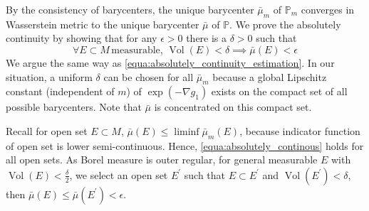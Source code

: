 By the consistency of barycenters, the unique barycenter $\bar{\mu}_m$ of $\mathbb{P}_m$
converges in Wasserstein metric to the unique barycenter $\bar{\mu}$ of $\mathbb{P}$.
We prove the absolutely continuity by showing that
for any $\epsilon > 0$ there is a $\delta > 0$ such that
\begin{equation}
	\label{equa:absolutely_continous}
	\forall E \subset M \, \text{measurable, } \operatorname{Vol}(E) < \delta
	\implies \bar{\mu}(E) < \epsilon
\end{equation}
We argue the same way as \cref{equa:absolutely_continuity_estimation}.
In our situation, a uniform $\delta$ can be chosen for all $\bar{\mu}_m$
because a global Lipschitz constant (independent of $m$)
of $\exp( - \nabla g_1)$ exists on the compact set of all possible barycenters.
Note that $\bar{\mu}$ is concentrated on this compact set.

Recall for open set $E \subset M$, $\bar{\mu}(E) \leq \liminf \bar{\mu}_m(E)$,
because indicator function of open set is lower semi-continuous.
Hence, \cref{equa:absolutely_continous} holds for all open sets.
As Borel measure is outer regular, for general measurable $E$ with $\operatorname{Vol}(E) < \frac{\delta}{2}$,
we select an open set $E^\prime$ such that
$ E \subset E^\prime$ and $ \operatorname{Vol}(E^\prime) < \delta$,
then $\bar{\mu}(E) \leq \bar{\mu}(E^\prime) < \epsilon$.
